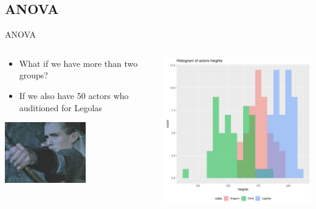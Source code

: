 \documentclass[aspectratio=169]{beamer}\usepackage[]{graphicx}\usepackage[]{color}
\makeatletter
\def\maxwidth{ %
  \ifdim\Gin@nat@width>\linewidth
    \linewidth
  \else
    \Gin@nat@width
  \fi
}
\newenvironment{knitrout}{}{} %
\makeatother
\begin{document}
\subsection{ANOVA}
\begin{frame}[fragile]{ANOVA}

\begin{columns}
  \begin{column}{0.5\textwidth}
  \begin{itemize}
    \item What if we have more than two groups?
    \item If we also have 50 actors who auditioned for Legolas
  \end{itemize}
  \begin{center}
      \includegraphics[width=0.55\textwidth]{./images/Legolas.jpg}
  \end{center}
  \end{column}
  \begin{column}{0.5\textwidth}
\begin{knitrout}\scriptsize
{}\color{fgcolor}
\includegraphics[width=\maxwidth]{figure/unnamed-chunk-31-1} 

\end{knitrout}
  \end{column}
\end{columns}
\end{frame}
\end{document}
